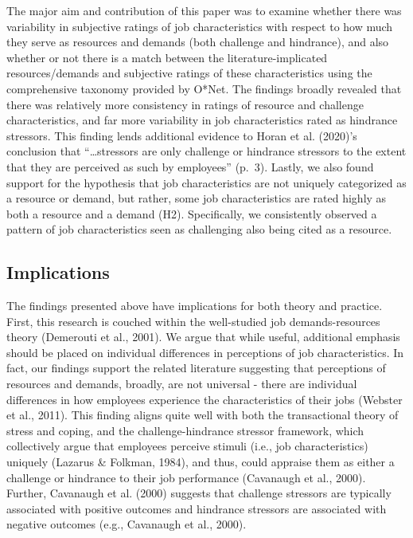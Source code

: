 \documentclass[
  man,mask]{apa7}
\begin{document}
The major aim and contribution of this paper was to examine whether there was variability in subjective ratings of job characteristics with respect to how much they serve as resources and demands (both challenge and hindrance), and also whether or not there is a match between the literature-implicated resources/demands and subjective ratings of these characteristics using the comprehensive taxonomy provided by O*Net. The findings broadly revealed that there was relatively more consistency in ratings of resource and challenge characteristics, and far more variability in job characteristics rated as hindrance stressors. This finding lends additional evidence to Horan et al. (2020)'s conclusion that ``\ldots stressors are only challenge or hindrance stressors to the extent that they are perceived as such by employees'' (p.~3). Lastly, we also found support for the hypothesis that job characteristics are not uniquely categorized as a resource or demand, but rather, some job characteristics are rated highly as both a resource and a demand (H2). Specifically, we consistently observed a pattern of job characteristics seen as challenging also being cited as a resource.

\hypertarget{implications}{%
\subsection{Implications}\label{implications}}

The findings presented above have implications for both theory and practice. First, this research is couched within the well-studied job demands-resources theory (Demerouti et al., 2001). We argue that while useful, additional emphasis should be placed on individual differences in perceptions of job characteristics. In fact, our findings support the related literature suggesting that perceptions of resources and demands, broadly, are not universal - there are individual differences in how employees experience the characteristics of their jobs (Webster et al., 2011). This finding aligns quite well with both the transactional theory of stress and coping, and the challenge-hindrance stressor framework, which collectively argue that employees perceive stimuli (i.e., job characteristics) uniquely (Lazarus \& Folkman, 1984), and thus, could appraise them as either a challenge or hindrance to their job performance (Cavanaugh et al., 2000). Further, Cavanaugh et al. (2000) suggests that challenge stressors are typically associated with positive outcomes and hindrance stressors are associated with negative outcomes (e.g., Cavanaugh et al., 2000).
\end{document}
